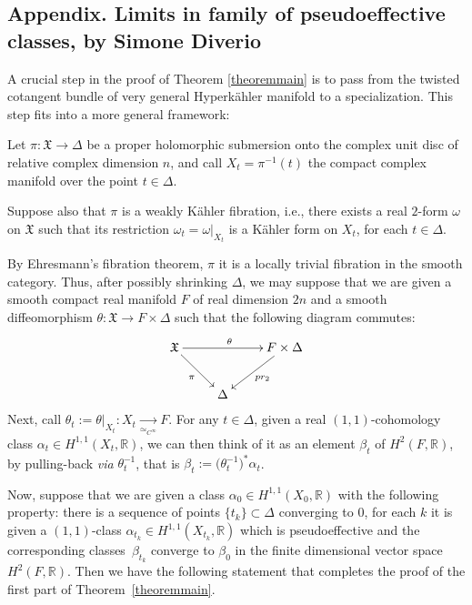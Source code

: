 \documentclass[11pt]{article}
\newcommand{\ie}{i.e.,\xspace}
\theoremstyle{plain}
\theoremstyle{definition}
\begin{document}
\begin{appendix}
\renewcommand{\thefootnote}{*}
\section*{Appendix. Limits in family of pseudoeffective classes, by Simone Diverio\texorpdfstring{\protect\footnotemark}{fn}}
\label{appendixdiverio}

A crucial step in the proof of Theorem \ref{theoremmain} is to pass from the twisted cotangent bundle of very general Hyperkähler manifold to a specialization. This step fits into a more general framework:

Let $\pi\colon\mathfrak X\to\Delta$ be a proper holomorphic submersion onto the complex unit disc of relative complex dimension $n$, and call $X_t=\pi^{-1}(t)$ the compact complex manifold over the point $t\in\Delta$.

Suppose also that $\pi$ is a weakly Kähler fibration, \ie there exists a real $2$-form $\omega$ on $\mathfrak X$ such that its restriction $\omega_t=\omega|_{X_t}$ is a Kähler form on $X_t$, for each $t\in\Delta$.

By Ehresmann's fibration theorem, $\pi$ it is a locally trivial fibration in the smooth category. Thus, after possibly shrinking $\Delta$, we may suppose that we are given a smooth compact real manifold $F$ of real dimension $2n$ and a smooth diffeomorphism $\theta\colon\mathfrak X\to F\times\Delta$ such that the following diagram commutes:
\[
\xymatrix{
\mathfrak X\ar[rr]^{\theta} \ar[dr]_{\pi}& & F\times\Delta \ar[dl]^{\textrm{pr}_2} \\
& \Delta
}
\]
Next, call $\theta_t:=\theta|_{X_t}\colon X_t\underset{\simeq_{C^\infty}}\to F$. For any $t\in\Delta$, given a real $(1,1)$-cohomology class $\alpha_t\in H^{1,1}(X_t,\mathbb R)$, we can then think of it as an element $\beta_t$ of $H^2(F,\mathbb R)$, by pulling-back \textsl{via} $\theta_t^{-1}$, that is $\beta_t:=\bigl(\theta_t^{-1}\bigr)^*\alpha_t$.

Now, suppose that we are given a class $\alpha_0\in H^{1,1}(X_0,\mathbb R)$ with the following property: there is a sequence of points $\{t_k\}\subset\Delta$ converging to $0$, for each $k$ it is given a $(1,1)$-class $\alpha_{t_k}\in H^{1,1}(X_{t_k},\mathbb R)$ which is pseudoeffective and the corresponding classes~$\beta_{t_k}$ converge to $\beta_0$ in the finite dimensional vector space $H^2(F,\mathbb R)$. Then we have the following statement that completes the proof of the first part of Theorem~\ref{theoremmain}.


\end{appendix}
\end{document}
